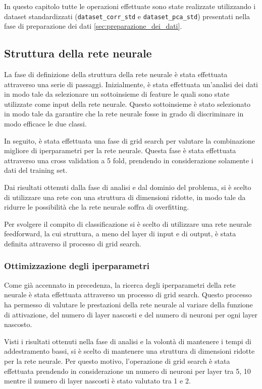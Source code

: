 In questo capitolo tutte le operazioni effettuate sono state realizzate
utilizzando i dataset standardizzati (\texttt{dataset\_corr\_std} e
\texttt{dataset\_pca\_std}) presentati nella fase di preparazione dei
dati \ref{sec:preparazione_dei_dati}.
\subsection{Struttura della rete neurale}
La fase di definizione della struttura della rete neurale è stata effettuata
attraverso una serie di passaggi. Inizialmente, è stata effettuata un'analisi
dei dati in modo tale da selezionare un sottoinsieme di feature le quali sono
state utilizzate come input della rete neurale. Questo sottoinsieme è stato
selezionato in modo tale da garantire che la rete neurale fosse in grado di
discriminare in modo efficace le due classi.

In seguito, è stata effettuata una fase di grid search per valutare la combinazione
migliore di iperparametri per la rete neurale. Questa fase è stata effettuata
attraverso una cross validation a 5 fold, prendendo in considerazione solamente
i dati del training set.

Dai risultati ottenuti dalla fase di analisi e dal dominio del problema, si è
scelto di utilizzare una rete con una struttura di dimensioni ridotte, in modo
tale da ridurre le possibilità che la rete neurale soffra di overfitting.

Per svolgere il compito di classificazione si è scelto di utilizzare una rete
neurale feedforward, la cui struttura, a meno del layer di input e di output, è
stata definita attraverso il processo di grid search.
\subsubsection{Ottimizzazione degli iperparametri}
Come già accennato in precedenza, la ricerca degli iperparametri della rete neurale
è stata effettuata attraverso un processo di grid search. Questo processo ha
permesso di valutare le prestazioni della rete neurale al variare della funzione
di attivazione, del numero di layer nascosti e del numero di neuroni per ogni
layer nascosto.

Visti i risultati ottenuti nella fase di analisi e la volontà di mantenere i
tempi di addestramento bassi, si è scelto di mantenere una struttura di dimensioni
ridotte per la rete neurale. Per questo motivo, l'operazione di grid search è
stata effettuata prendendo in considerazione un numero di neuroni per layer
tra 5, 10 mentre il numero di layer nascosti è stato valutato tra 1 e 2.

